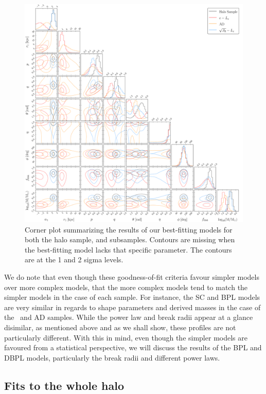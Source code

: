 \begin{figure}
    \centering
    \includegraphics[width=\linewidth]{figure/ch3/posterior.pdf}
    \caption{Corner plot summarizing the results of our best-fitting models for both the halo sample, and \gse subsamples. Contours are missing when the best-fitting model lacks that specific parameter. The contours are at the 1 and 2 sigma levels.}
    \label{fig:posterior}
\end{figure}

We do note that even though these goodness-of-fit criteria favour simpler models over more complex models, that the more complex models tend to match the simpler models in the case of each sample. For instance, the SC and BPL models are very similar in regards to shape parameters and derived masses in the case of the \eLz\ and AD samples. While the power law and break radii appear at a glance disimilar, as mentioned above and as we shall show, these profiles are not particularly different. With this in mind, even though the simpler models are favoured from a statistical perspective, we will discuss the results of the BPL and DBPL models, particularly the break radii and different power laws.

\subsection{Fits to the whole halo}


